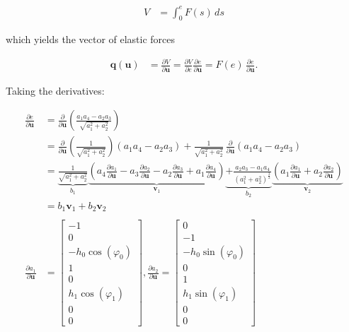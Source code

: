 \begin{align*}
V &= \int_{0}^{e}F(s)\,ds
\end{align*}

which yields the vector of elastic forces

\begin{align}
\boldsymbol{q}(\boldsymbol{u}) &= \frac{\partial V}{\partial \boldsymbol{u}} = \frac{\partial V}{\partial e}\frac{\partial e}{\partial \boldsymbol{u}} = F(e)\,\frac{\partial e}{\partial \boldsymbol{u}}.
\end{align}

Taking the derivatives:

\begin{align*}
\frac{\partial e}{\partial \boldsymbol{u}} &= \frac{\partial}{\partial \boldsymbol{u}}\left(\frac{a_1 a_4 - a_2 a_3}{\sqrt{a_1^2 + a_2^2}}\right)\\
&= \frac{\partial}{\partial \boldsymbol{u}}\left(\frac{1}{\sqrt{a_1^2 + a_2^2}}\right)\left(a_1 a_4 - a_2 a_3\right) + \frac{1}{\sqrt{a_1^2 + a_2^2}}\,\frac{\partial}{\partial \boldsymbol{u}}\left(a_1 a_4 - a_2 a_3\right)\\
&=
\underbrace{\frac{1}{\sqrt{a_1^2 + a_2^2}}}_{b_1} \underbrace{\left(a_4\frac{\partial a_1}{\partial \boldsymbol{u}} - a_3\frac{\partial a_2}{\partial \boldsymbol{u}} - a_2\frac{\partial a_3}{\partial \boldsymbol{u}} + a_1\frac{\partial a_4}{\partial \boldsymbol{u}}\right)}_{\boldsymbol{v}_1}
\underbrace{+\frac{a_2 a_3 - a_1 a_4}{(a_1^2 + a_2^2)^\frac{3}{2}}}_{b_2}
\underbrace{\left(a_1\frac{\partial a_1}{\partial \boldsymbol{u}} + a_2\frac{\partial a_2}{\partial \boldsymbol{u}}\right)}_{\boldsymbol{v}_2}\\
&= b_1\boldsymbol{v}_1 + b_2\boldsymbol{v}_2\\
\\
\frac{\partial a_1}{\partial \boldsymbol{u}} &=
\begin{bmatrix}
-1\\ 0\\ -h_0 \cos(\varphi_0)\\ 1\\ 0\\ h_1 \cos(\varphi_1)\\ 0\\ 0
\end{bmatrix},
\frac{\partial a_2}{\partial \boldsymbol{u}} =
\begin{bmatrix}
0\\ -1\\ -h_0 \sin(\varphi_0)\\ 0\\ 1\\ h_1 \sin(\varphi_1)\\ 0\\ 0

\end{bmatrix}
\end{align*}
